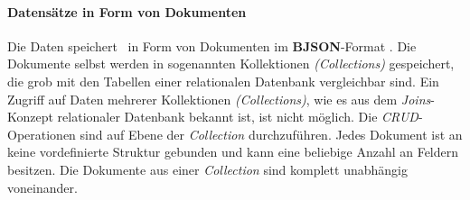 \paragraph{Datensätze in Form von Dokumenten}

Die Daten speichert \mongo\ in Form von Dokumenten im \textbf{BJSON}-Format \cite{bjson}. Die Dokumente selbst werden in sogenannten Kollektionen \textit{(Collections)} gespeichert, die grob mit den Tabellen einer relationalen Datenbank vergleichbar sind. Ein Zugriff auf Daten mehrerer Kollektionen \textit{(Collections)}, wie es aus dem \textit{Joins}-Konzept relationaler Datenbank bekannt ist, ist nicht möglich. Die \textit{CRUD}-Operationen sind auf Ebene der \textit{Collection} durchzuführen. Jedes Dokument ist an keine vordefinierte Struktur gebunden und kann eine beliebige Anzahl an Feldern besitzen. Die Dokumente aus einer \textit{Collection} sind komplett unabhängig voneinander. 

